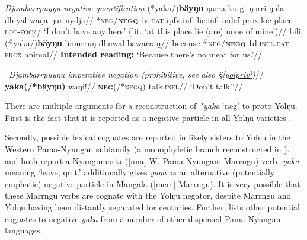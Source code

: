 {\pex{} \textit{Djambarrpuyŋu negative quantification}
\a\begingl
	\gla (*yaka/)\textbf{bäyŋu} ŋarra-ku gi ŋorri ŋula dhiyal wäŋa-ŋur-nydja//
	\glb \textsc{*neg/\textbf{negq}} 1\gls{s}\textsc{-dat} \gls{ipfv}.\gls{infl} lie:\gls{infl} \gls{indef} \gls{prox}.\gls{loc} place-\textsc{loc-foc}//
	\glft`I don't have any here' (lit. `at this place lie (are) none of mine')//
	\endgl
\a\begingl\gla bili ($^\#$yaka/)\textbf{bäyŋu} limurruŋ dhuwal bäwarraṉ//
\glb because \textsc{$^\#$neg/\textbf{negq}} 1\gls{d}.\textsc{incl.dat} \textsc{prox} animal//
\glft\textbf{Intended reading:} `Because there's no meat for us.'//\endgl{}
\xe

\pex~\begingl\glpreamble\textit{Djambarrpuyŋu imperative negation (prohibitive, see also §\ref{yolpriv})}//
\gla \textbf{yaka(/*bäyŋu)} waŋi!//
\glb \textsc{\textbf{neg}(/*negq)} talk.\textsc{infl}//
\glft`Don't talk!'//\endgl\xe


There are multiple arguments for a reconstruction of \textit{*yaka} `\gls{neg}' to proto-Yolŋu. First is the fact that it is reported as a negative particle in all Yolŋu varieties \citep[31]{Schebeck2001}.

 Secondly, possible lexical cognates are reported in likely sisters to Yolŋu in the Western Pama-Nyungan subfamily (a monophyletic branch reconstructed in \citealt[838]{Bowern2012}). \citet[226]{Sharp2004} and \citet[67]{Ogrady1963} both report a Nyangumarta ([\gls{nna}] W. Pama-Nyungan: Marrngu) verb \textit{-yaka-} meaning `leave, quit.' \citet[35]{Mckelson1974} additionally gives \textit{yaga} as an alternative (potentially emphatic) negative particle in Mangala ([\gls{mem}] Marrngu). It is very possible that these Marrngu verbs are cognate with the Yolŋu negator, despite Marrngu and Yolŋu having been distantly separated for centuries. Further, \citet[85]{Dixon2002a} lists other potential cognates to negative \textit{yaka} from a number of other dispersed Pama-Nyungan languages.
 
}
